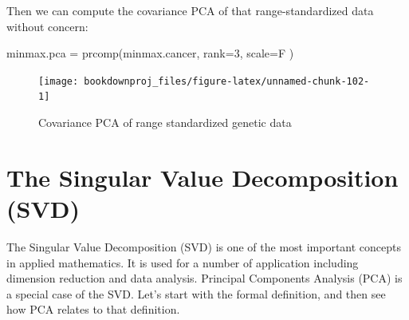 \documentclass[
]{article}
\newenvironment{Shaded}{\begin{snugshade}}{\end{snugshade}}
\newcommand{\AttributeTok}[1]{\textcolor[rgb]{0.77,0.63,0.00}{#1}}
\newcommand{\DecValTok}[1]{\textcolor[rgb]{0.00,0.00,0.81}{#1}}
\newcommand{\FunctionTok}[1]{\textcolor[rgb]{0.00,0.00,0.00}{#1}}
\newcommand{\NormalTok}[1]{#1}
\newcommand{\OtherTok}[1]{\textcolor[rgb]{0.56,0.35,0.01}{#1}}
\newcommand{\SpecialCharTok}[1]{\textcolor[rgb]{0.00,0.00,0.00}{#1}}
\newcommand{\StringTok}[1]{\textcolor[rgb]{0.31,0.60,0.02}{#1}}
\theoremstyle{definition}
\theoremstyle{definition}
\theoremstyle{definition}
\theoremstyle{definition}
\theoremstyle{remark}
\begin{document}
Then we can compute the covariance PCA of that range-standardized data without concern:

\begin{Shaded}
\begin{Highlighting}[]
\NormalTok{minmax.pca }\OtherTok{=} \FunctionTok{prcomp}\NormalTok{(minmax.cancer, }\AttributeTok{rank=}\DecValTok{3}\NormalTok{, }\AttributeTok{scale=}\NormalTok{F )  }
\end{Highlighting}
\end{Shaded}

\begin{Shaded}
\end{Shaded}

\begin{figure}

{\centering \texttt{[image: bookdownproj\_files/figure-latex/unnamed-chunk-102-1]} 

}

\caption{Covariance PCA of range standardized genetic data}\label{fig:unnamed-chunk-102}
\end{figure}

\hypertarget{svd}{%
\section{The Singular Value Decomposition (SVD)}\label{svd}}

The Singular Value Decomposition (SVD) is one of the most important concepts in applied mathematics. It is used for a number of application including dimension reduction and data analysis. Principal Components Analysis (PCA) is a special case of the SVD. Let's start with the formal definition, and then see how PCA relates to that definition.
\end{document}
